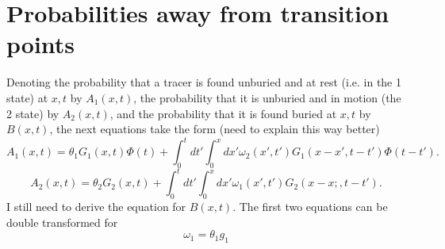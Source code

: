 \documentclass[11pt]{article}
\newcommand\be{\begin{equation}} %
\newcommand\ee{\end{equation}}   %
\begin{document}
\section{Probabilities away from transition points}
Denoting the probability that a tracer is found unburied and at rest (i.e. in the 1 state) at $x,t$ by $A_1(x,t)$, the probability that it is unburied and in motion (the 2 state) by $A_2(x,t)$, and the probability that it is found buried at $x,t$ by $B(x,t)$, the next equations take the form (need to explain this way better)
\be 
A_1(x,t) = \theta_1 G_1(x,t) \Phi(t) + \int_0^t dt' \int_0^x dx' \omega_2(x',t')G_1(x-x',t-t')\Phi(t-t').\ee 
\be 
A_2(x,t) = \theta_2 G_2(x,t) + \int_0^t dt' \int_0^x dx' \omega_1(x',t')G_2(x-x;,t-t').\ee
I still need to derive the equation for $B(x,t).$
The first two equations can be double transformed for 
\be \omega_1 = \theta_1 g_1\ee



\end{document}
